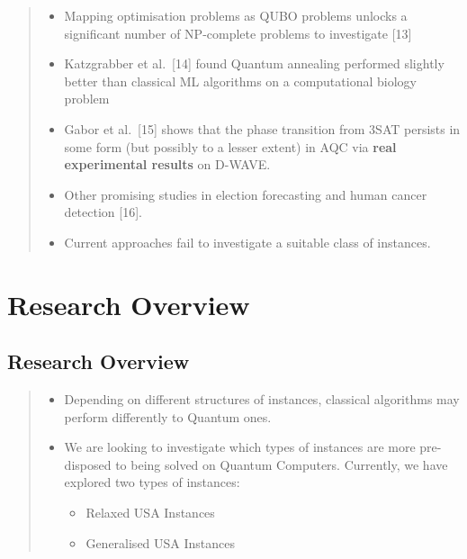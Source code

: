 \documentclass[
]{article}
\providecommand{\tightlist}{%
  \setlength{\itemsep}{0pt}\setlength{\parskip}{0pt}}
\begin{document}
\begin{quote}
\begin{itemize}
\tightlist
\item
  Mapping optimisation problems as QUBO problems unlocks a significant
  number of NP-complete problems to investigate {[}13{]}
\item
  Katzgrabber et al.~{[}14{]} found Quantum annealing performed slightly
  better than classical ML algorithms on a computational biology problem
\item
  Gabor et al.~{[}15{]} shows that the phase transition from 3SAT
  persists in some form (but possibly to a lesser extent) in AQC via
  \textbf{real experimental results} on D-WAVE.
\item
  Other promising studies in election forecasting and human cancer
  detection {[}16{]}.
\item
  Current approaches fail to investigate a suitable class of instances.
\end{itemize}
\end{quote}

\hypertarget{research-overview}{%
\section{Research Overview}\label{research-overview}}

\hypertarget{research-overview-1}{%
\subsection{Research Overview}\label{research-overview-1}}

\begin{quote}
\begin{itemize}
\tightlist
\item
  Depending on different structures of instances, classical algorithms
  may perform differently to Quantum ones.
\item
  We are looking to investigate which types of instances are more
  pre-disposed to being solved on Quantum Computers. Currently, we have
  explored two types of instances:

  \begin{itemize}
  \tightlist
  \item
    Relaxed USA Instances
  \item
    Generalised USA Instances
  \end{itemize}
\end{itemize}
\end{quote}
\end{document}
